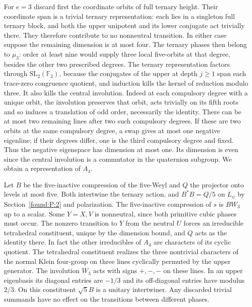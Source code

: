 \documentclass[11pt,a4paper]{article}
\numberwithin{equation}{section}
\theoremstyle{remark}
\begin{document}
For $e=3$ discard first the coordinate orbits of full ternary height. Their coordinate span is a trivial ternary representation: each lies in a singleton full ternary block, and both the upper unipotent and its lower conjugate act trivially there. They therefore contribute to no nonneutral transition. In either case suppose the remaining dimension is at most four. The ternary phases then belong to $\mu_3$: order at least nine would supply three local five-orbits at that degree, besides the other two prescribed degrees. The ternary representation factors through $\mathrm{SL}_2(\mathbb F_3)$, because the conjugates of the upper at depth $j\ge1$ span each trace-zero congruence quotient, and induction kills the kernel of reduction modulo three. It also kills the central involution. Indeed at each compulsory degree with a unique orbit, the involution preserves that orbit, acts trivially on its fifth roots and so induces a translation of odd order, necessarily the identity. There can be at most two remaining lines after two such compulsory degrees. If these are two orbits at the same compulsory degree, a swap gives at most one negative eigenline; if their degrees differ, one is the third compulsory degree and fixed. Thus the negative eigenspace has dimension at most one. Its dimension is even since the central involution is a commutator in the quaternion subgroup. We obtain a representation of $A_4$.

Let $B$ be the five-inactive compression of the five-Weyl and $Q$ the projector onto levels at most five. Both intertwine the ternary action, and $B^*B=Q/5$ on $L_\psi$ by Section~\ref{found:P:2} and polarization. The five-inactive compression of $s$ is $BW_3$ up to a scalar. Some $Y=X,V$ is nonneutral, since both primitive cubic phases must occur. The nonzero transition to $Y$ from the neutral $U$ forces an irreducible tetrahedral constituent, unique by the dimension bound, and $Q$ acts as the identity there. In fact the other irreducibles of $A_4$ are characters of its cyclic quotient. The tetrahedral constituent realizes the three nontrivial characters of the normal Klein four-group on three lines cyclically permuted by the upper generator. The involution $W_3$ acts with signs $+,-,-$ on these lines. In an upper eigenbasis its diagonal entries are $-1/3$ and its off-diagonal entries have modulus $2/3$. On this constituent $\sqrt5 B$ is a unitary intertwiner. Any discarded trivial summands have no effect on the transitions between different phases.
\end{document}
